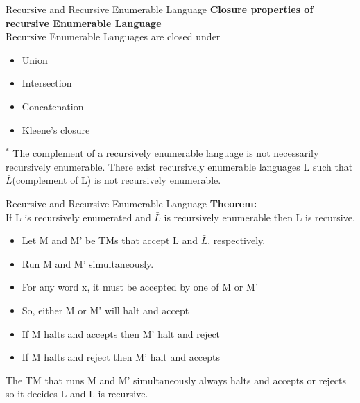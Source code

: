 \documentclass{beamer}
\begin{document}
\begin{frame}{Recursive and Recursive Enumerable Language}
		\textbf{Closure properties of recursive Enumerable Language } \\
		 Recursive Enumerable Languages are closed under

\begin{itemize}
	\item Union
	\item Intersection
	\item Concatenation
	\item Kleene's closure
\end{itemize}
$^*$ The complement of a recursively enumerable language is not necessarily recursively enumerable. There exist recursively enumerable languages L such that $\bar{L}$(complement of L) is not recursively enumerable.
\end{frame}
\begin{frame}{Recursive and Recursive Enumerable Language}
\textbf{Theorem:} \\
If L is recursively enumerated and $\bar{L}$ is recursively enumerable then L is recursive.
\proofname
\begin{itemize}
	\item Let M and M' be TMs that accept L and $\bar{L}$, respectively. 
	\item Run M and M' simultaneously. 
	\item For any word x, it must be accepted by one of M or M' 
	\item So, either M or M' will halt and accept 
	\item If M halts and accepts then M' halt and reject
	\item If M halts and reject  then M' halt and accepts
\end{itemize}
The TM that runs M and M' simultaneously always halts and accepts or rejects so it decides L 
and L is recursive. 
\end{frame}
\end{document}
